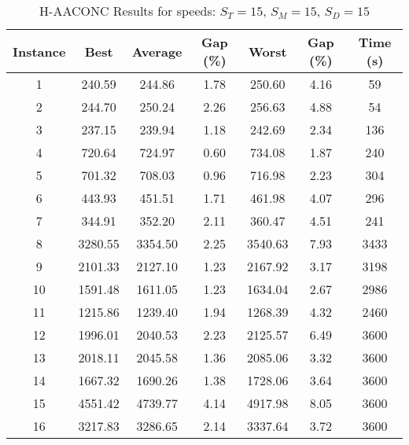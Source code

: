 \begin{table}[h]
	\centering
	\caption{H-AACONC Results for speeds: $S_T=15$, $S_M=15$, $S_D=15$}
	\begin{tabular}{@{}ccccccc@{}}
		\midrule
		\textbf{Instance} & \textbf{Best} & \textbf{Average} & \textbf{Gap (\%)} & \textbf{Worst} & \textbf{Gap (\%)} & \textbf{Time (s)} \\ \midrule
		1  & 240.59 & 244.86 & 1.78 & 250.60 & 4.16 & 59   \\ \midrule
		2  & 244.70 & 250.24 & 2.26 & 256.63 & 4.88 & 54  \\ \midrule
		3  & 237.15 & 239.94 & 1.18 & 242.69 & 2.34 & 136  \\ \midrule
		4  & 720.64 & 724.97 & 0.60 & 734.08 & 1.87 & 240  \\ \midrule
		5  & 701.32 & 708.03 & 0.96 & 716.98 & 2.23 & 304  \\ \midrule
		6  & 443.93 & 451.51 & 1.71 & 461.98 & 4.07 & 296  \\ \midrule
		7  & 344.91 & 352.20 & 2.11 & 360.47 & 4.51 & 241  \\ \midrule
		8  & 3280.55 & 3354.50 & 2.25 & 3540.63 & 7.93 & 3433  \\ \midrule
		9  & 2101.33 & 2127.10 & 1.23 & 2167.92 & 3.17 & 3198  \\ \midrule
		10 & 1591.48 & 1611.05 & 1.23 & 1634.04 & 2.67 & 2986  \\ \midrule
		11 & 1215.86 & 1239.40 & 1.94 & 1268.39 & 4.32 & 2460  \\ \midrule
		12 & 1996.01 & 2040.53 & 2.23 & 2125.57 & 6.49 & 3600  \\ \midrule
		13 & 2018.11 & 2045.58 & 1.36 & 2085.06 & 3.32 & 3600  \\ \midrule
		14 & 1667.32 & 1690.26 & 1.38 & 1728.06 & 3.64 & 3600  \\ \midrule
		15 & 4551.42 & 4739.77 & 4.14 & 4917.98 & 8.05 & 3600  \\ \midrule
		16 & 3217.83 & 3286.65 & 2.14 & 3337.64 & 3.72 & 3600  \\ \midrule
	\end{tabular}
	\label{table:ACO_15-15-15}
\end{table}